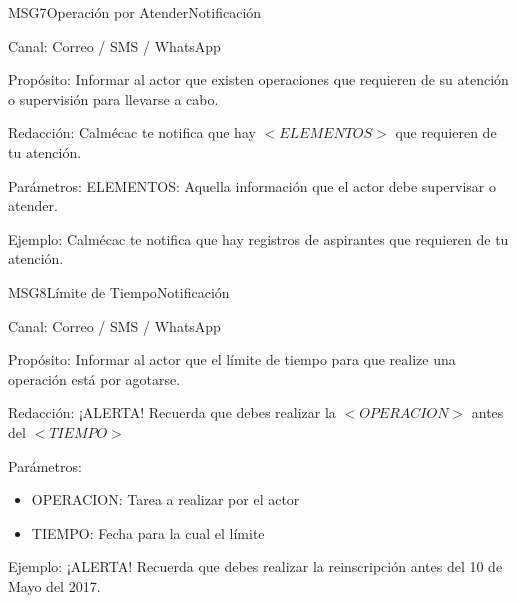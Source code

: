 \begin{mensaje}{MSG7}{Operación por Atender}{Notificación \msgNotif}
	\item[Canal:] Correo / SMS / WhatsApp
	\item[Propósito:] Informar al actor que existen operaciones que requieren de su atención o supervisión para llevarse a cabo.
	\item[Redacción:] Calmécac te notifica que hay $<ELEMENTOS>$ que requieren de tu atención.
	\item[Parámetros:] ELEMENTOS: Aquella información que el actor debe supervisar o atender.
	\item[Ejemplo:] Calmécac te notifica que hay registros de aspirantes que requieren de tu atención.
\end{mensaje}




\begin{mensaje}{MSG8}{Límite de Tiempo}{Notificación \msgNotif}
	\item[Canal:] Correo / SMS / WhatsApp
	\item[Propósito:] Informar al actor que el límite de tiempo para que realize una operación está por agotarse.
	\item[Redacción:]¡ALERTA! Recuerda que debes realizar la $<OPERACION>$ antes del $<TIEMPO>$
	\item[Parámetros:]\cdtEmpty
		\begin{itemize}
			\item OPERACION: Tarea a realizar por el actor
			\item TIEMPO: Fecha para la cual el límite 
		\end{itemize}
	\item[Ejemplo:] ¡ALERTA! Recuerda que debes realizar la reinscripción antes del 10 de Mayo del 2017.
\end{mensaje}



